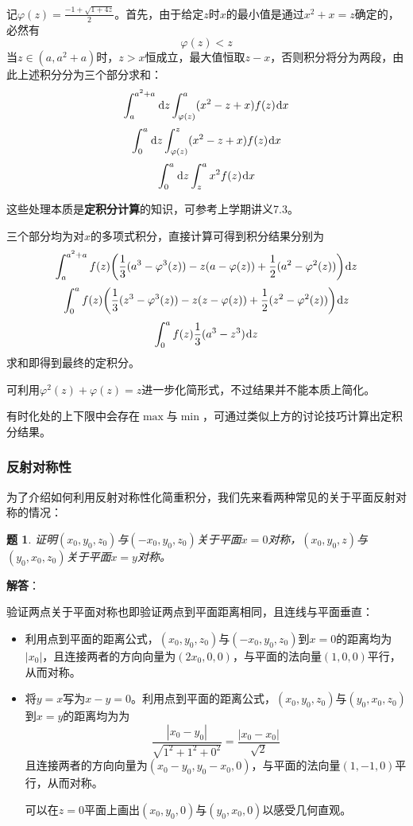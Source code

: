 \documentclass[a4paper,UTF8,fontset=windows,AutoFakeBold]{ctexart}
\newcommand*{\dr}{\hspace{0.07em}\mathrm{d}}
\newcommand*{\note}{\noindent *}
\theoremstyle{ex}
\newtheorem{exercise}{题}
\newcommand{\sol}[1]{{\vspace{5pt}\kaishu\noindent\textbf{解答}：\vspace{-3pt}
\begin{compactitem}
    \item[] #1
\end{compactitem}
}}
\begin{document}
\begin{framed}
{\begin{itemize}
        记$\varphi(z)=\frac{-1+\sqrt{1+4z}}{2}$。首先，由于给定$z$时$x$的最小值是通过$x^2+x=z$确定的，必然有
        $$\varphi(z)<z$$
        当$z\in(a,a^2+a)$时，$z>x$恒成立，最大值恒取$z-x$，否则积分将分为两段，由此上述积分分为三个部分求和：
        $$\int_a^{a^2+a}\dr z\int_{\varphi(z)}^a(x^2-z+x)f(z)\dr x$$
        $$\int_0^a\dr z\int_{\varphi(z)}^z(x^2-z+x)f(z)\dr x$$
        $$\int_0^a\dr z\int_z^ax^2f(z)\dr x$$

        \note 这些处理本质是\textbf{定积分计算}的知识，可参考上学期讲义7.3。

        三个部分均为对$x$的多项式积分，直接计算可得到积分结果分别为
        $$\int_a^{a^2+a}f(z)\bigg(\frac{1}{3}(a^3-\varphi^3(z))-z(a-\varphi(z))+\frac{1}{2}(a^2-\varphi^2(z))\bigg)\dr z$$
        $$\int_0^af(z)\bigg(\frac{1}{3}(z^3-\varphi^3(z))-z(z-\varphi(z))+\frac{1}{2}(z^2-\varphi^2(z))\bigg)\dr z$$
        $$\int_0^af(z)\frac{1}{3}(a^3-z^3)\dr z$$
        求和即得到最终的定积分。

        \note 可利用$\varphi^2(z)+\varphi(z)=z$进一步化简形式，不过结果并不能本质上简化。
    \end{itemize}
}
\end{framed}
有时化处的上下限中会存在$\max$与$\min$，可通过类似上方的讨论技巧计算出定积分结果。

\subsubsection{反射对称性}
为了介绍如何利用反射对称性化简重积分，我们先来看两种常见的关于平面反射对称的情况：
\begin{framed}
\begin{exercise}
    证明$(x_0,y_0,z_0)$与$(-x_0,y_0,z_0)$关于平面$x=0$对称，$(x_0,y_0,z)$与$(y_0,x_0,z_0)$关于平面$x=y$对称。
\end{exercise}
\sol{
    验证两点关于平面对称也即验证两点到平面距离相同，且连线与平面垂直：
    \begin{itemize}
        \item 利用点到平面的距离公式，$(x_0,y_0,z_0)$与$(-x_0,y_0,z_0)$到$x=0$的距离均为$|x_0|$，且连接两者的方向向量为$(2x_0,0,0)$，与平面的法向量$(1,0,0)$平行，从而对称。
        \item 将$y=x$写为$x-y=0$。利用点到平面的距离公式，$(x_0,y_0,z_0)$与$(y_0,x_0,z_0)$到$x=y$的距离均为为
        $$\frac{|x_0-y_0|}{\sqrt{1^2+1^2+0^2}}=\frac{|x_0-x_0|}{\sqrt2}$$
        且连接两者的方向向量为$(x_0-y_0,y_0-x_0,0)$，与平面的法向量$(1,-1,0)$平行，从而对称。
        
        \note 可以在$z=0$平面上画出$(x_0,y_0,0)$与$(y_0,x_0,0)$以感受几何直观。
    \end{itemize}
}
\end{framed}
\end{document}
